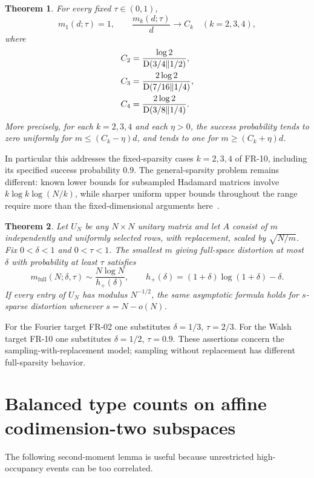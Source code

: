 \documentclass[11pt]{article}
\newtheorem{theorem}{Theorem}\newtheorem{lemma}[theorem]{Lemma}
\theoremstyle{remark}\newtheorem{remark}[theorem]{Remark}
\begin{document}
\begin{theorem}\label{thm:low}
For every fixed $\tau\in(0,1)$,
\[
 m_1(d;\tau)=1,\qquad
 \frac{m_k(d;\tau)}d\longrightarrow C_k\quad(k=2,3,4),
\]
where
\begin{align*}
 C_2&=\frac{\log2}{\operatorname{D}(3/4\Vert1/2)},\\
 C_3&=\frac{2\log2}{\operatorname{D}(7/16\Vert1/4)},\\
 C_4&=\frac{2\log2}{\operatorname{D}(3/8\Vert1/4)}.
\end{align*}
More precisely, for each $k=2,3,4$ and each $\eta>0$, the success probability tends to zero uniformly for $m\le(C_k-\eta)d$, and tends to one for $m\ge(C_k+\eta)d$.
\end{theorem}

In particular this addresses the fixed-sparsity cases $k=2,3,4$ of FR-10, including its specified success probability $0.9$. The general-sparsity problem remains different: known lower bounds for subsampled Hadamard matrices involve $k\log k\log(N/k)$, while sharper uniform upper bounds throughout the range require more than the fixed-dimensional arguments here~\cite{BLM,HR}.

\begin{theorem}\label{thm:full}
Let $U_N$ be any $N\times N$ unitary matrix and let $A$ consist of $m$ independently and uniformly selected rows, with replacement, scaled by $\sqrt{N/m}$. Fix $0<\delta<1$ and $0<\tau<1$. The smallest $m$ giving full-space distortion at most $\delta$ with probability at least $\tau$ satisfies
\[
 m_{\mathrm{full}}(N;\delta,\tau)\sim
 \frac{N\log N}{h_+(\delta)},\qquad
 h_+(\delta)=(1+\delta)\log(1+\delta)-\delta.
\]
If every entry of $U_N$ has modulus $N^{-1/2}$, the same asymptotic formula holds for $s$-sparse distortion whenever $s=N-o(N)$.
\end{theorem}

For the Fourier target FR-02 one substitutes $\delta=1/3$, $\tau=2/3$. For the Walsh target FR-10 one substitutes $\delta=1/2$, $\tau=0.9$. These assertions concern the sampling-with-replacement model; sampling without replacement has different full-sparsity behavior.

\section{Balanced type counts on affine codimension-two subspaces}
The following second-moment lemma is useful because unrestricted high-occupancy events can be too correlated.
\end{document}
